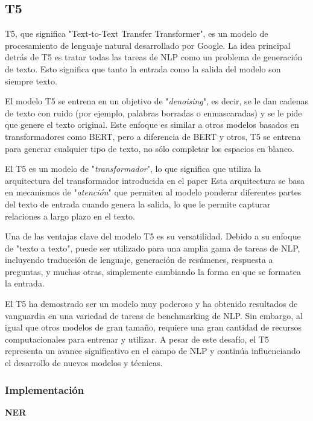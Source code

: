 \documentclass[10pt]{article} %
\begin{document}
	\subsection{T5}
	
	T5, que significa "Text-to-Text Transfer Transformer", es un modelo de procesamiento de lenguaje natural desarrollado por Google. La idea principal detrás de T5 es tratar todas las tareas de NLP como un problema de generación de texto. Esto significa que tanto la entrada como la salida del modelo son siempre texto.
	
	El modelo T5 se entrena en un objetivo de "\textit{denoising}", es decir, se le dan cadenas de texto con ruido (por ejemplo, palabras borradas o enmascaradas) y se le pide que genere el texto original. Este enfoque es similar a otros modelos basados en transformadores como BERT, pero a diferencia de BERT y otros, T5 se entrena para generar cualquier tipo de texto, no sólo completar los espacios en blanco.
	
	El T5 es un modelo de "\textit{transformador}", lo que significa que utiliza la arquitectura del transformador introducida en el paper  Esta arquitectura se basa en mecanismos de "\textit{atención}" que permiten al modelo ponderar diferentes partes del texto de entrada cuando genera la salida, lo que le permite capturar relaciones a largo plazo en el texto.
	
	Una de las ventajas clave del modelo T5 es su versatilidad. Debido a su enfoque de "texto a texto", puede ser utilizado para una amplia gama de tareas de NLP, incluyendo traducción de lenguaje, generación de resúmenes, respuesta a preguntas, y muchas otras, simplemente cambiando la forma en que se formatea la entrada.
	
	El T5 ha demostrado ser un modelo muy poderoso y ha obtenido resultados de vanguardia en una variedad de tareas de benchmarking de NLP. Sin embargo, al igual que otros modelos de gran tamaño, requiere una gran cantidad de recursos computacionales para entrenar y utilizar. A pesar de este desafío, el T5 representa un avance significativo en el campo de NLP y continúa influenciando el desarrollo de nuevos modelos y técnicas.
	
	\subsubsection{Implementaci\'on}
	\textbf{NER}
	\vspace{0.5em}
	
\end{document}
